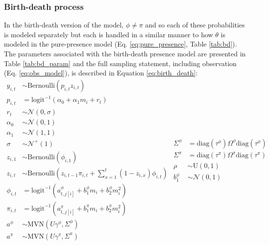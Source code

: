\subsubsection*{Birth-death process}
In the birth-death version of the model, \(\phi \neq \pi\) and so each of these probabilities is modeled separately but each is handled in a similar manner to how \(\theta\) is modeled in the pure-presence model (Eq. \ref{eq:pure_presence}, Table \ref{tab:bd}). The parameters associated with the birth-death presence model are presented in Table \ref{tab:bd_param} and the full sampling statement, including observation (Eq. \ref{eq:obs_model}), is described in Equation \ref{eq:birth_death}:
\begin{equation}
  \begin{split}
    y_{i, t} &\sim \text{Bernoulli}(p_{i, t} z_{i, t}) \\
    p_{i, t} &= \text{logit}^{-1}(\alpha_{0} + \alpha_{1} m_{i} + r_{t}) \\ 
    r_{t} &\sim \mathcal{N}(0, \sigma) \\
    \alpha_{0} &\sim \mathcal{N}(0, 1) \\
    \alpha_{1} &\sim \mathcal{N}(1, 1) \\
    \sigma &\sim \mathcal{N}^{+}(1) \\
    z_{i, 1} &\sim \text{Bernoulli}(\phi_{i, 1}) \\
    z_{i, t} &\sim \text{Bernoulli}\left(z_{i, t - 1} \pi_{i,t} + \sum_{x = 1}^{t}(1 - z_{i, x}) \phi_{i,t}\right) \\
    \phi_{i, t} &= \text{logit}^{-1}(a^{\phi}_{t, j[i]} + b^{\phi}_{1} m_{i} + b^{\phi}_{2} m_{i}^{2}) \\
    \pi_{i, t} &= \text{logit}^{-1}(a^{\pi}_{t, j[i]} + b^{\pi}_{1} m_{i} + b^{\pi}_{2} m_{i}^{2}) \\
    a^{\phi} &\sim \text{MVN}(U \gamma^{\phi}, \Sigma^{\phi}) \\
    a^{\pi} &\sim \text{MVN}(U \gamma^{\pi}, \Sigma^{\pi}) \\
  \end{split}
  \begin{split}
    \Sigma^{\phi} &= \text{diag}(\tau^{\phi}) \Omega^{\phi} \text{diag}(\tau^{\phi}) \\
    \Sigma^{\pi} &= \text{diag}(\tau^{\pi}) \Omega^{\pi} \text{diag}(\tau^{\pi}) \\
    \rho &\sim \text{U}(0, 1) \\
    b^{\phi}_{1} &\sim \mathcal{N}(0, 1) \\

\end{split}
\end{equation}

